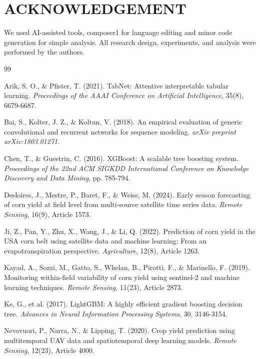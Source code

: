 \documentclass[10pt,twocolumn]{article}
\begin{document}
\section{ACKNOWLEDGEMENT}

We used AI-assisted tools, composer1 for language editing and minor code generation for simple analysis. All research design, experiments, and analysis were performed by the authors.

\begin{thebibliography}{99}

Arik, S. O., \& Pfister, T. (2021). TabNet: Attentive interpretable tabular learning. \textit{Proceedings of the AAAI Conference on Artificial Intelligence}, 35(8), 6679-6687.

Bai, S., Kolter, J. Z., \& Koltun, V. (2018). An empirical evaluation of generic convolutional and recurrent networks for sequence modeling. \textit{arXiv preprint arXiv:1803.01271}.

Chen, T., \& Guestrin, C. (2016). XGBoost: A scalable tree boosting system. \textit{Proceedings of the 22nd ACM SIGKDD International Conference on Knowledge Discovery and Data Mining}, pp. 785-794.

Desloires, J., Mestre, P., Baret, F., \& Weiss, M. (2024). Early season forecasting of corn yield at field level from multi-source satellite time series data. \textit{Remote Sensing}, 16(9), Article 1573.

Ji, Z., Pan, Y., Zhu, X., Wang, J., \& Li, Q. (2022). Prediction of corn yield in the USA corn belt using satellite data and machine learning: From an evapotranspiration perspective. \textit{Agriculture}, 12(8), Article 1263.

Kayad, A., Sozzi, M., Gatto, S., Whelan, B., Pirotti, F., \& Marinello, F. (2019). Monitoring within-field variability of corn yield using sentinel-2 and machine learning techniques. \textit{Remote Sensing}, 11(23), Article 2873.

Ke, G., et al. (2017). LightGBM: A highly efficient gradient boosting decision tree. \textit{Advances in Neural Information Processing Systems}, 30, 3146-3154.

Nevavuori, P., Narra, N., \& Lipping, T. (2020). Crop yield prediction using multitemporal UAV data and spatiotemporal deep learning models. \textit{Remote Sensing}, 12(23), Article 4000.


\end{thebibliography}
\end{document}
